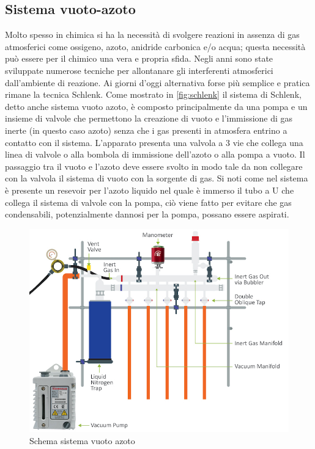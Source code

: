 
\begin{appendix}
\section{Sistema vuoto-azoto}
Molto spesso in chimica si ha la necessità di svolgere reazioni in assenza di gas atmosferici come ossigeno, azoto, anidride carbonica e/o acqua; questa necessità può essere per il chimico una vera e propria sfida. Negli anni sono state sviluppate numerose tecniche per allontanare gli interferenti atmosferici dall'ambiente di reazione. Ai giorni d'oggi alternativa forse più semplice e pratica rimane la tecnica Schlenk. Come mostrato in \autoref{fig:schlenk} il sistema di Schlenk, detto anche sistema vuoto azoto, è composto principalmente da una pompa e un insieme di valvole che permettono la creazione di vuoto e l'immissione di gas inerte (in questo caso azoto) senza che i gas presenti in atmosfera entrino a contatto con il sistema. L'apparato presenta una valvola a 3 vie che collega una linea di valvole o alla bombola di immissione dell'azoto o alla pompa a vuoto. Il passaggio tra il vuoto e l'azoto deve essere svolto in modo tale da non collegare con la valvola il sistema di vuoto con la sorgente di gas. Si noti come nel sistema è presente un resevoir per l'azoto liquido nel quale è immerso il tubo a U che collega il sistema di valvole con la pompa, ciò viene fatto per evitare che gas condensabili, potenzialmente dannosi per la pompa, possano essere aspirati. 


\begin{figure}[h! ]
    \centering
\includegraphics[width=0.6\linewidth]{Relazione/foto/Schlenk lines diagram.jpg}
    \caption{Schema sistema vuoto azoto}
    \label{fig:schlenk}


\end{figure}


\end{appendix}
